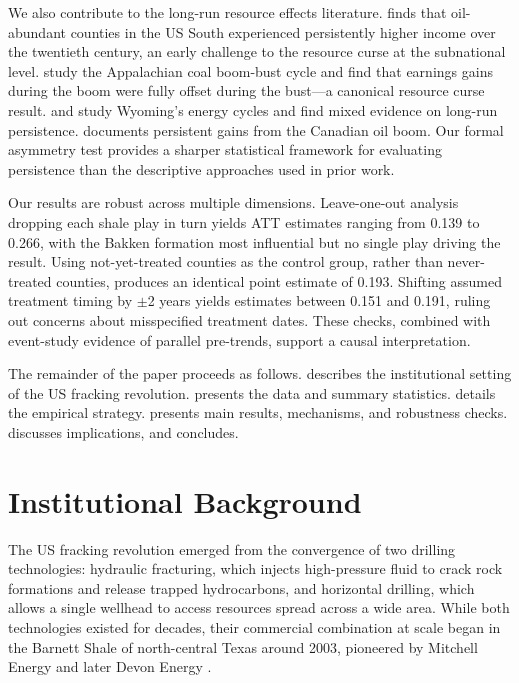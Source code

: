 \documentclass[12pt]{article}
\begin{document}
We also contribute to the long-run resource effects literature. \citet{michaels2011fiscal} finds that oil-abundant counties in the US South experienced persistently higher income over the twentieth century, an early challenge to the resource curse at the subnational level. \citet{black2005boom} study the Appalachian coal boom-bust cycle and find that earnings gains during the boom were fully offset during the bust---a canonical resource curse result. \citet{jacobsen2016resource} and \citet{jacobsen2023long} study Wyoming's energy cycles and find mixed evidence on long-run persistence. \citet{marchand2012local} documents persistent gains from the Canadian oil boom. Our formal asymmetry test provides a sharper statistical framework for evaluating persistence than the descriptive approaches used in prior work.

Our results are robust across multiple dimensions. Leave-one-out analysis dropping each shale play in turn yields ATT estimates ranging from 0.139 to 0.266, with the Bakken formation most influential but no single play driving the result. Using not-yet-treated counties as the control group, rather than never-treated counties, produces an identical point estimate of 0.193. Shifting assumed treatment timing by $\pm$2 years yields estimates between 0.151 and 0.191, ruling out concerns about misspecified treatment dates. These checks, combined with event-study evidence of parallel pre-trends, support a causal interpretation.

The remainder of the paper proceeds as follows.  describes the institutional setting of the US fracking revolution.  presents the data and summary statistics.  details the empirical strategy.  presents main results, mechanisms, and robustness checks.  discusses implications, and  concludes.


\section{Institutional Background}
\label{sec:background}

The US fracking revolution emerged from the convergence of two drilling technologies: hydraulic fracturing, which injects high-pressure fluid to crack rock formations and release trapped hydrocarbons, and horizontal drilling, which allows a single wellhead to access resources spread across a wide area. While both technologies existed for decades, their commercial combination at scale began in the Barnett Shale of north-central Texas around 2003, pioneered by Mitchell Energy and later Devon Energy \citep{wang2014natural}.
\end{document}
